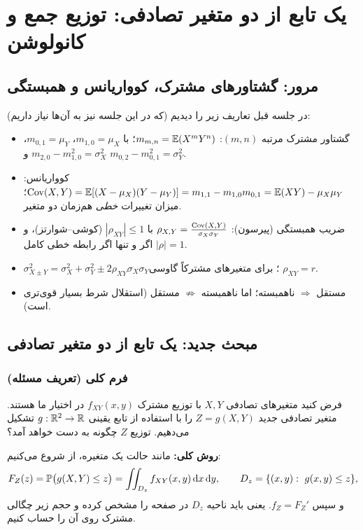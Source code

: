 \chapter{یک تابع از دو متغیر تصادفی: توزیع جمع و کانولوشن}

\section{مرور: گشتاورهای مشترک، کوواریانس و همبستگی}

در جلسه قبل تعاریف زیر را دیدیم (که در این جلسه نیز به آن‌ها نیاز داریم):
\begin{itemize}
\item گشتاور مشترک مرتبه $(m,n)$: $m_{m,n}=\mathbb{E}(X^mY^n)$؛ با $m_{1,0}=\mu_X$، $m_{0,1}=\mu_Y$، $m_{2,0}-m_{1,0}^2=\sigma_X^2$ و $m_{0,2}-m_{0,1}^2=\sigma_Y^2$.
\item کوواریانس: $\operatorname{Cov}(X,Y)=\mathbb{E}[(X-\mu_X)(Y-\mu_Y)]=m_{1,1}-m_{1,0}m_{0,1}=\mathbb{E}(XY)-\mu_X\mu_Y$؛ میزان تغییرات \emph{خطی} هم‌زمان دو متغیر.
\item ضریب همبستگی (پیرسون): $\rho_{X,Y}=\frac{\operatorname{Cov}(X,Y)}{\sigma_X\sigma_Y}$ با $|\rho_{XY}|\le1$ (کوشی--شوارتز)، و $|\rho|=1$ اگر و تنها اگر رابطه خطی کامل.
\item $\sigma^2_{X\pm Y}=\sigma_X^2+\sigma_Y^2\pm2\rho_{XY}\sigma_X\sigma_Y$؛ برای متغیرهای مشترکاً گاوسی $\rho_{XY}=r$.
\item مستقل $\Rightarrow$ ناهمبسته؛ اما ناهمبسته $\not\Rightarrow$ مستقل (استقلال شرط بسیار قوی‌تری است).
\end{itemize}

\section{مبحث جدید: یک تابع از دو متغیر تصادفی}

\subsection{فرم کلی (تعریف مسئله)}
فرض کنید متغیرهای تصادفی $X,Y$ با توزیع مشترک $f_{XY}(x,y)$ در اختیار ما هستند. متغیر تصادفی جدید $Z=g(X,Y)$ را با استفاده از تابع یقینی $g:\mathbb{R}^2\to\mathbb{R}$ تشکیل می‌دهیم. توزیع $Z$ چگونه به دست خواهد آمد؟

\textbf{روش کلی:} مانند حالت یک متغیره، از  شروع می‌کنیم:
\[
F_Z(z)=\mathbb{P}\big(g(X,Y)\le z\big)=\iint_{D_z}f_{XY}(x,y)\,\mathrm{d} x\,\mathrm{d} y,\qquad D_z=\{(x,y):\ g(x,y)\le z\},
\]
و سپس $f_Z=F_Z'$. یعنی باید ناحیه $D_z$ در صفحه را مشخص کرده و حجم زیر چگالی مشترک روی آن را حساب کنیم.


